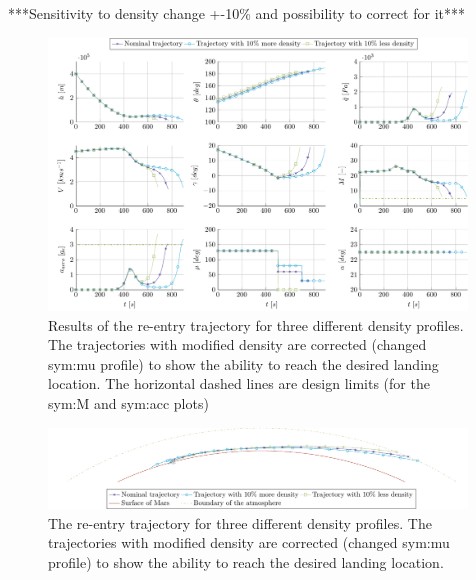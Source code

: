 ***Sensitivity to density change +-10\% and possibility to correct for it***\\
\begin{figure}
	\centering
	\includegraphics[width=0.99\textwidth]{Figure/Orbit/sensitivity_entry.pdf}
	\caption{Results of the re-entry trajectory for three different density profiles. The trajectories with modified density are corrected (changed \gls{sym:mu} profile) to show the ability to reach the desired landing location. The horizontal dashed lines are design limits (for the \gls{sym:M} and \gls{sym:acc} plots)}
	\label{fig:orbit_entry_data}
\end{figure}

\begin{figure}[h]
	\centering
	\includegraphics[width=0.99\textwidth]{Figure/Orbit/entry_mars.pdf}
	\caption{The re-entry trajectory for three different density profiles. The trajectories with modified density are corrected (changed \gls{sym:mu} profile) to show the ability to reach the desired landing location.}
	\label{fig:entry_mars}
\end{figure}
